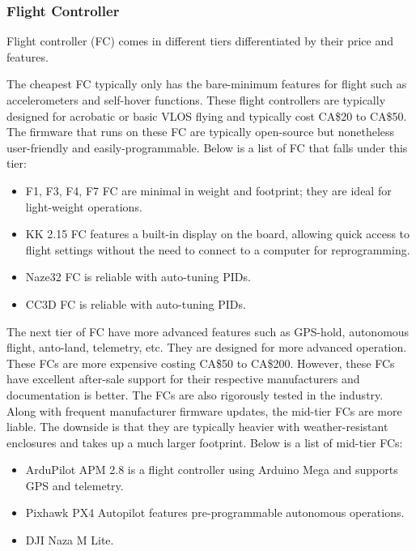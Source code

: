 \subsubsection{Flight Controller}

Flight controller (FC) comes in different tiers differentiated by their price and features. 

The cheapest FC typically only has the bare-minimum features for flight such as accelerometers and 
self-hover functions. These flight controllers are typically designed for acrobatic or basic VLOS 
flying and typically cost CA\$20 to CA\$50. The firmware that runs on these FC are typically 
open-source but nonetheless user-friendly and easily-programmable. Below is a list of FC that falls 
under this tier:

\begin{itemize}[noitemsep,topsep=0pt, parsep=4pt, partopsep=0pt]
    \item F1, F3, F4, F7 FC are minimal in weight and footprint; they are ideal for light-weight operations.\cite{f1fc}
    \item KK 2.15 FC features a built-in display on the board, allowing quick access to flight settings without the need to connect to a computer for reprogramming.
    \item Naze32 FC is reliable with auto-tuning PIDs.
    \item CC3D FC is reliable with auto-tuning PIDs.
\end{itemize}

The next tier of FC have more advanced features such as GPS-hold, autonomous flight, anto-land, 
telemetry, etc. They are designed for more advanced operation. These FCs are more expensive costing 
CA\$50 to CA\$200. However, these FCs have excellent after-sale support for their respective 
manufacturers and documentation is better. The FCs are also rigorously tested in the industry. Along 
with frequent manufacturer firmware updates, the mid-tier FCs are more liable. The downside is that 
they are typically heavier with weather-resistant enclosures and takes up a much larger footprint. 
Below is a list of mid-tier FCs:

\begin{itemize}[noitemsep,topsep=0pt, parsep=4pt, partopsep=0pt]
    \item ArduPilot APM 2.8 is a flight controller using Arduino Mega and supports GPS and telemetry.
    \item Pixhawk PX4 Autopilot features pre-programmable autonomous operations.
    \item DJI Naza M Lite.
\end{itemize}

